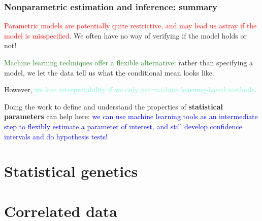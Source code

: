 \documentclass[12pt, 
hyperref={colorlinks=true, linkcolor=blue, urlcolor=cyan},dvipsnames]{beamer}
\begin{document}
\begin{frame}
\frametitle{Nonparametric estimation and inference: summary}

\textcolor{red}{Parametric models are potentially quite restrictive, and may lead us astray if the model is misspecified}. We often have no way of verifying if the model holds or not!

\textcolor{ForestGreen}{Machine learning techniques offer a flexible alternative}: rather than specifying a model, we let the data tell us what the conditional mean looks like.

However, \textcolor{Aquamarine}{we lose interpretability if we only use machine learning-based methods}. 

Doing the work to define and understand the properties of \textbf{statistical parameters} can help here: \textcolor{blue}{we can use machine learning tools as an intermediate step to flexibly estimate a parameter of interest, and still develop confidence intervals and do hypothesis tests! }
\end{frame}

\section{Statistical genetics}

\section{Correlated data}
\end{document}
